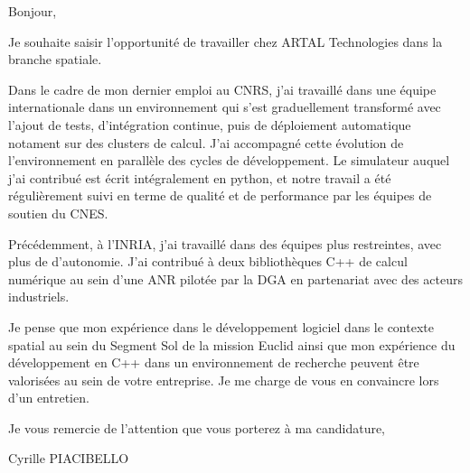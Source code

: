 \documentclass{article}
\begin{document}
Bonjour,

Je souhaite saisir l'opportunité de travailler chez ARTAL Technologies
dans la branche spatiale.

Dans le cadre de mon dernier emploi au CNRS, j'ai travaillé dans une
équipe internationale dans un environnement qui s'est graduellement
transformé avec l'ajout de tests, d'intégration continue, puis de
déploiement automatique notament sur des clusters de calcul. J'ai
accompagné cette évolution de l'environnement en parallèle des cycles
de développement. Le simulateur auquel j'ai contribué est écrit
intégralement en python, et notre travail a été régulièrement suivi en
terme de qualité et de performance par les équipes de soutien du CNES.

Précédemment, à l'INRIA, j'ai travaillé dans des équipes plus
restreintes, avec plus de d'autonomie. J'ai contribué à deux
bibliothèques C++ de calcul numérique au sein d'une ANR pilotée par la
DGA en partenariat avec des acteurs industriels.

Je pense que mon expérience dans le développement logiciel dans le
contexte spatial au sein du Segment Sol de la mission Euclid ainsi que
mon expérience du développement en C++ dans un environnement de
recherche peuvent être valorisées au sein de votre entreprise. Je me
charge de vous en convaincre lors d'un entretien.


\bigskip %

Je vous remercie de l'attention que vous porterez à ma candidature,

\vspace{50pt} %

Cyrille PIACIBELLO
\end{document}
